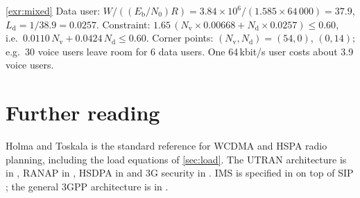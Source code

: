 \documentclass[11pt,a4paper]{article}
\begin{document}
\begin{solutionbox}{\ref{exr:mixed}}
Data user: $W/((E_\mathrm{b}/N_0)R) = 3.84\times10^6/(1.585\times64\,000) = 37.9$,
$L_\mathrm{d} = 1/38.9 = 0.0257$. Constraint:
$1.65\,(N_\mathrm{v}\times0.00668 + N_\mathrm{d}\times0.0257) \le 0.60$, i.e.\
$0.0110\,N_\mathrm{v} + 0.0424\,N_\mathrm{d} \le 0.60$. Corner points: $(N_\mathrm{v},N_\mathrm{d}) =
(54,0)$, $(0,14)$; e.g.\ 30 voice users leave room for 6 data users. One 64\,kbit/s user costs
about 3.9 voice users.
\end{solutionbox}

\section{Further reading}
Holma and Toskala \cite{holma2010wcdma} is the standard reference for WCDMA and HSPA radio
planning, including the load equations of \cref{sec:load}. The UTRAN architecture is in
\cite{ts25401}, RANAP in \cite{ts25413}, HSDPA in \cite{ts25308} and 3G security in
\cite{ts33102}. IMS is specified in \cite{ts23228} on top of SIP \cite{rfc3261}; the general
3GPP architecture is in \cite{ts23002}.

\printbibliography[heading=subbibliography,title={\ACNstrRefs}]
\end{document}
